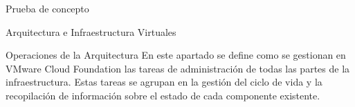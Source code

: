 \begin{section}{Prueba de concepto}
\begin{subsection}{Arquitectura e Infraestructura Virtuales\cite{CFVirtInfraes}}


\end{subsection}


\begin{subsection}{Operaciones de la Arquitectura\cite{CFopermanagement}}
En este apartado se define como se gestionan en VMware Cloud Foundation las tareas de administración de todas las partes de la infraestructura. Estas tareas se agrupan en la gestión del ciclo de vida y la recopilación de información sobre el estado de cada componente existente.


\end{subsection}
\end{section}

